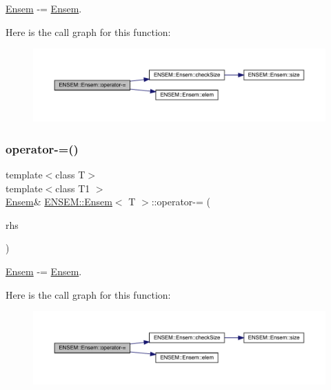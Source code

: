 \mbox{\hyperlink{classENSEM_1_1Ensem}{Ensem}} -\/= \mbox{\hyperlink{classENSEM_1_1Ensem}{Ensem}}. 

Here is the call graph for this function\+:
\nopagebreak
\begin{figure}[H]
\begin{center}
\leavevmode
\includegraphics[width=350pt]{d7/d3e/classENSEM_1_1Ensem_ae3f3e36d96a4600e56c2b139e7897186_cgraph}
\end{center}
\end{figure}
\mbox{\label{classENSEM_1_1Ensem_ae3f3e36d96a4600e56c2b139e7897186}} 
\subsubsection{\texorpdfstring{operator-\/=()}{operator-=()}\hspace{0.1cm}{\footnotesize\ttfamily [4/4]}}
{\footnotesize\ttfamily template$<$class T$>$ \\
template$<$class T1 $>$ \\
\mbox{\hyperlink{classENSEM_1_1Ensem}{Ensem}}\& \mbox{\hyperlink{classENSEM_1_1Ensem}{E\+N\+S\+E\+M\+::\+Ensem}}$<$ T $>$\+::operator-\/= (\begin{DoxyParamCaption}\item[{const \mbox{\hyperlink{classENSEM_1_1Ensem}{Ensem}}$<$ T1 $>$ \&}]{rhs }\end{DoxyParamCaption})\hspace{0.3cm}{\ttfamily [inline]}}



\mbox{\hyperlink{classENSEM_1_1Ensem}{Ensem}} -\/= \mbox{\hyperlink{classENSEM_1_1Ensem}{Ensem}}. 

Here is the call graph for this function\+:
\nopagebreak
\begin{figure}[H]
\begin{center}
\leavevmode
\includegraphics[width=350pt]{d7/d3e/classENSEM_1_1Ensem_ae3f3e36d96a4600e56c2b139e7897186_cgraph}
\end{center}
\end{figure}
\mbox{\label{classENSEM_1_1Ensem_a32bf70c0844ce98695151457bf9df018}} 
